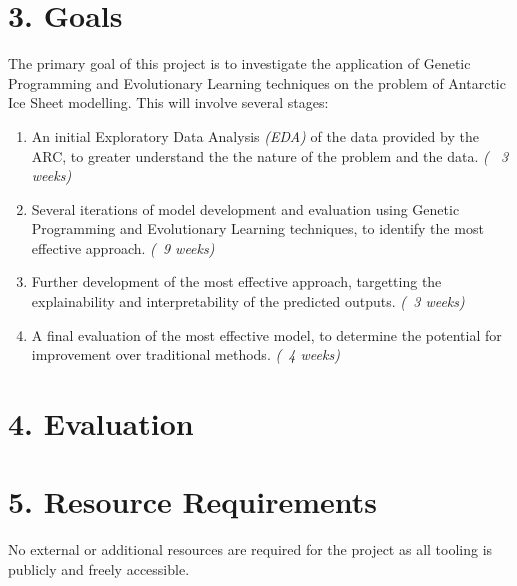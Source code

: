 \documentclass[11pt, a4paper, twoside, openright]{report}
\begin{document}
\section*{3. Goals}

The primary goal of this project is to investigate the
application of Genetic Programming and Evolutionary Learning
techniques on the problem of Antarctic Ice Sheet modelling.
This will involve several stages:
\begin{enumerate}
\item An initial Exploratory Data Analysis \textit{(EDA)} of
  the data provided by the ARC, to greater understand the
  the nature of the problem and the data. \textit{(~ 3 weeks)}
\item Several iterations of model development and evaluation
  using Genetic Programming and Evolutionary Learning
  techniques, to identify the most effective approach.
  \textit{(~9 weeks)}
\item Further development of the most effective approach,
  targetting the explainability and interpretability of
  the predicted outputs. \textit{(~3 weeks)}
\item A final evaluation of the most effective model, to
  determine the potential for improvement over traditional
  methods. \textit{(~4 weeks)}
\end{enumerate}

\section*{4. Evaluation}



\section*{5. Resource Requirements}

No external or additional resources are required for the
project as all tooling is publicly and freely accessible.

\backmatter

%


\end{document}
